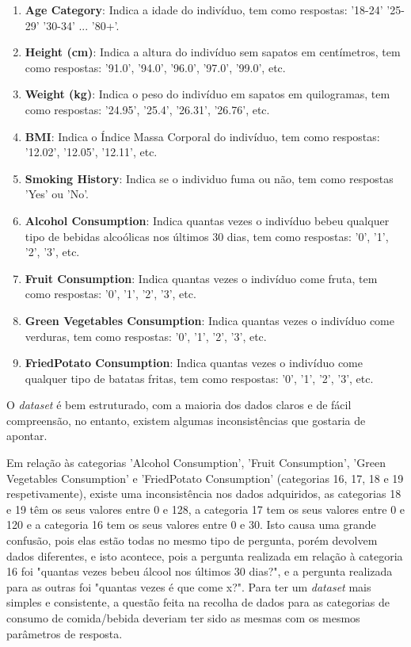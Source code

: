 \begin{enumerate}
  \item \textbf{Age Category}: Indica a idade do indivíduo, tem como respostas: '18-24' '25-29' '30-34' ... '80+'.
  \item \textbf{Height (cm)}: Indica a altura do indivíduo sem sapatos em centímetros, tem como respostas: '91.0', '94.0', '96.0', '97.0', '99.0', etc.
  \item \textbf{Weight (kg)}: Indica o peso do indivíduo em sapatos em quilogramas, tem como respostas: '24.95', '25.4', '26.31', '26.76', etc.
  \item \textbf{BMI}: Indica o Índice Massa Corporal do indivíduo, tem como respostas: '12.02', '12.05', '12.11', etc.
  \item \textbf{Smoking History}: Indica se o individuo fuma ou não, tem como respostas 'Yes' ou 'No'.
  \item \textbf{Alcohol Consumption}: Indica quantas vezes o indivíduo bebeu qualquer tipo de bebidas alcoólicas nos últimos 30 dias, tem como respostas: '0', '1', '2', '3', etc.
  \item \textbf{Fruit Consumption}: Indica quantas vezes o indivíduo come fruta, tem como respostas: '0', '1', '2', '3', etc.
  \item \textbf{Green Vegetables Consumption}: Indica quantas vezes  o indivíduo come verduras, tem como respostas: '0', '1', '2', '3', etc.
  \item \textbf{FriedPotato Consumption}: Indica quantas vezes o indivíduo come qualquer tipo de batatas fritas, tem como respostas: '0', '1', '2', '3', etc.
\end{enumerate}

O \textit{dataset} é bem estruturado, com a maioria dos dados claros e de fácil compreensão, no entanto, existem algumas inconsistências que gostaria de apontar.
    
Em relação às categorias 'Alcohol Consumption', 'Fruit Consumption', 'Green Vegetables Consumption' e 'FriedPotato Consumption' (categorias 16, 17, 18 e 19 respetivamente), existe uma inconsistência nos dados adquiridos, as categorias 18 e 19 têm os seus valores entre 0 e 128, a categoria 17 tem os seus valores entre 0 e 120 e a categoria 16 tem os seus valores entre 0 e 30. Isto causa uma grande confusão, pois elas estão todas no mesmo tipo de pergunta, porém devolvem dados diferentes, e isto acontece, pois a pergunta realizada em relação à categoria 16 foi "quantas vezes bebeu álcool nos últimos 30 dias?", e a pergunta realizada para as outras foi "quantas vezes é que come x?". Para ter um \textit{dataset} mais simples e consistente, a questão feita na recolha de dados para as categorias de consumo de comida/bebida deveriam ter sido as mesmas com os mesmos parâmetros de resposta.


